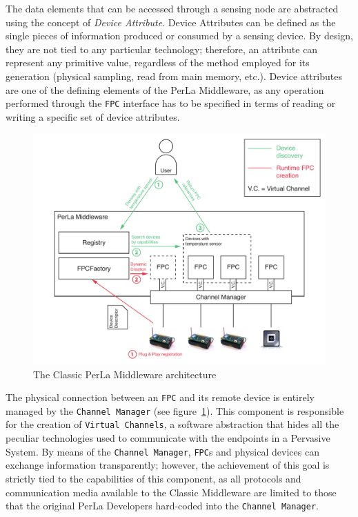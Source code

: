 The data elements that can be accessed through a sensing node are abstracted
using the concept of \textit{Device Attribute}. Device Attributes can be
defined as the single pieces of information produced or consumed by a sensing
device. By design, they are not tied to any particular technology; therefore,
an attribute can represent any primitive value, regardless of the method
employed for its generation (physical sampling, read from main memory, etc.).
Device attributes are one of the defining elements of the PerLa Middleware, as
any operation performed through the \texttt{FPC} interface has to be specified
in terms of reading or writing a specific set of device attributes.

\begin{figure}[h!]
\includegraphics[width=\textwidth]{imgs/classic_middleware_overview.pdf}
\caption{The Classic PerLa Middleware architecture}
\label{fig:classic_architecture}
\end{figure}

The physical connection between an \texttt{FPC} and its remote device is
entirely managed by the \texttt{Channel Manager} (see
figure~\ref{fig:classic_architecture}). This component is responsible for the
creation of \texttt{Virtual Channels}, a software abstraction that hides all
the peculiar technologies used to communicate with the endpoints in a Pervasive
System. By means of the \texttt{Channel Manager}, \texttt{FPC}s and physical
devices can exchange information transparently; however, the achievement of
this goal is strictly tied to the capabilities of this component, as all
protocols and communication media available to the Classic Middleware are
limited to those that the original PerLa Developers hard-coded into the
\texttt{Channel Manager}.

